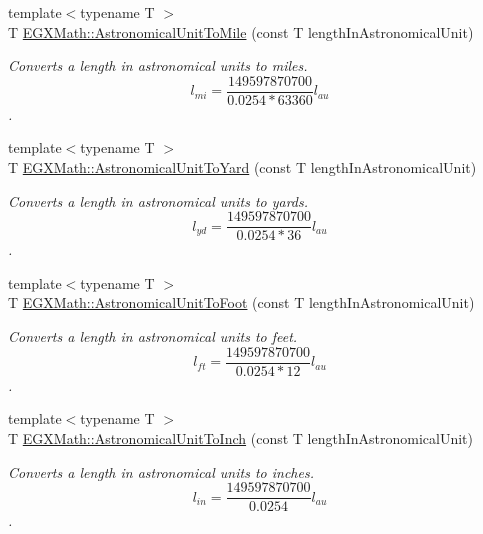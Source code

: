 \begin{DoxyCompactItemize}
{\footnotesize template$<$typename T $>$ }\\T \mbox{\hyperlink{group___e_g_x_math-_conversions-_length_conversions-_astronomical-_astronomical_unit-_imperial_ga24da571320e08bb0a057e77e15e786b1}{E\+G\+X\+Math\+::\+Astronomical\+Unit\+To\+Mile}} (const T length\+In\+Astronomical\+Unit)
\begin{DoxyCompactList}\small\item\em Converts a length in astronomical units to miles. \[ l_{mi}=\frac{149597870700}{0.0254 * 63360} l_{au} \]. \end{DoxyCompactList}\item 
{\footnotesize template$<$typename T $>$ }\\T \mbox{\hyperlink{group___e_g_x_math-_conversions-_length_conversions-_astronomical-_astronomical_unit-_imperial_ga7d383bdfc1850ed19f5b6df13704c7af}{E\+G\+X\+Math\+::\+Astronomical\+Unit\+To\+Yard}} (const T length\+In\+Astronomical\+Unit)
\begin{DoxyCompactList}\small\item\em Converts a length in astronomical units to yards. \[ l_{yd}= \frac{149597870700}{0.0254 * 36} l_{au} \]. \end{DoxyCompactList}\item 
{\footnotesize template$<$typename T $>$ }\\T \mbox{\hyperlink{group___e_g_x_math-_conversions-_length_conversions-_astronomical-_astronomical_unit-_imperial_ga09db4693d70e24b3a933582badf882af}{E\+G\+X\+Math\+::\+Astronomical\+Unit\+To\+Foot}} (const T length\+In\+Astronomical\+Unit)
\begin{DoxyCompactList}\small\item\em Converts a length in astronomical units to feet. \[ l_{ft}= \frac{149597870700}{0.0254 * 12} l_{au} \]. \end{DoxyCompactList}\item 
{\footnotesize template$<$typename T $>$ }\\T \mbox{\hyperlink{group___e_g_x_math-_conversions-_length_conversions-_astronomical-_astronomical_unit-_imperial_ga75ba3ea9f789b7d12627bc67e4a4e904}{E\+G\+X\+Math\+::\+Astronomical\+Unit\+To\+Inch}} (const T length\+In\+Astronomical\+Unit)
\begin{DoxyCompactList}\small\item\em Converts a length in astronomical units to inches. \[ l_{in}= \frac{149597870700}{0.0254} l_{au} \]. \end{DoxyCompactList}\item 

\end{DoxyCompactItemize}

